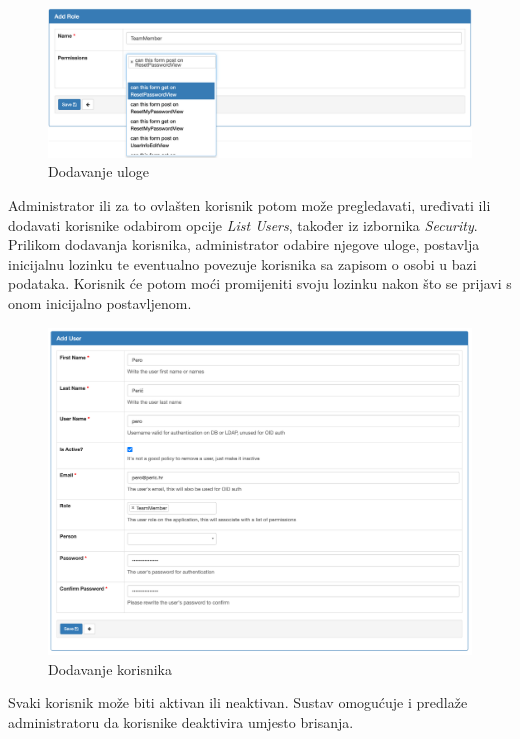\documentclass[times, utf8, diplomski]{fer}
\begin{document}
\begin{figure}[H]
    \centering
    \includegraphics[width=1\textwidth]{slike/addrole.png}
    \caption{Dodavanje uloge}
    \label{fig:addrole}
\end{figure}

Administrator ili za to ovlašten korisnik potom može pregledavati, uređivati ili
dodavati korisnike odabirom opcije \emph{List Users}, također iz izbornika
\emph{Security}. Prilikom dodavanja korisnika, administrator odabire njegove
uloge, postavlja inicijalnu lozinku te eventualno povezuje korisnika sa zapisom
o osobi u bazi podataka. Korisnik će potom moći promijeniti svoju lozinku nakon
što se prijavi s onom inicijalno postavljenom.

\begin{figure}[H]
    \centering
    \includegraphics[width=1\textwidth]{slike/userform.png}
    \caption{Dodavanje korisnika}
    \label{fig:userform}
\end{figure}

Svaki korisnik može biti aktivan ili neaktivan. Sustav omogućuje i
predlaže administratoru da korisnike deaktivira umjesto brisanja.
\end{document}
